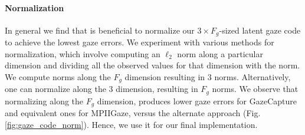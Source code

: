 \documentclass[10pt,twocolumn,letterpaper]{article}
\begin{document}
\paragraph{Normalization}

In general we find that is beneficial to normalize our $3\times F_g$-sized latent gaze code to achieve the lowest gaze errors. We experiment with various methods for normalization, which involve computing an $\ell_2$ norm along a particular dimension and dividing all the observed values for that dimension with the norm. We compute norms along the $F_g$ dimension resulting in $3$ norms. Alternatively, one can normalize along the $3$ dimension, resulting in $F_g$ norms. We observe that normalizing along the $F_g$ dimension, produces lower gaze errors for GazeCapture and equivalent ones for MPIIGaze, versus the alternate approach (Fig. \ref{fig:gaze_code_norm}). Hence, we use it for our final implementation. 
\end{document}
